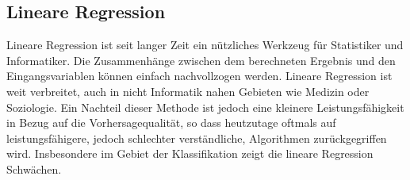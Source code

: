 \documentclass[
  12pt, %
  a4paper, %
  oneside, %
  openany, 
  numbers=noenddot, %
  BCOR=5mm, %
  parskip=half*, %
  thesis, %
]{bfhbook}
\begin{document}
\subsection{Lineare Regression}
\label{lr}
Lineare Regression ist seit langer Zeit ein nützliches Werkzeug für Statistiker und Informatiker. Die Zusammenhänge zwischen dem berechneten Ergebnis und den Eingangsvariablen können einfach nachvollzogen werden. Lineare Regression ist weit verbreitet, auch in nicht Informatik nahen Gebieten wie Medizin oder Soziologie. Ein Nachteil dieser Methode ist jedoch eine kleinere Leistungsfähigkeit in Bezug auf die Vorhersagequalität, so dass heutzutage oftmals auf leistungsfähigere, jedoch schlechter verständliche, Algorithmen zurückgegriffen wird. Insbesondere im Gebiet der Klassifikation zeigt die lineare Regression Schwächen.
\end{document}
